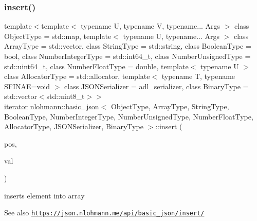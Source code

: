\subsubsection{\texorpdfstring{insert()}{insert()}\hspace{0.1cm}{\footnotesize\ttfamily [1/6]}}
{\footnotesize\ttfamily template$<$template$<$ typename U, typename V, typename... Args $>$ class Object\+Type = std\+::map, template$<$ typename U, typename... Args $>$ class Array\+Type = std\+::vector, class String\+Type  = std\+::string, class Boolean\+Type  = bool, class Number\+Integer\+Type  = std\+::int64\+\_\+t, class Number\+Unsigned\+Type  = std\+::uint64\+\_\+t, class Number\+Float\+Type  = double, template$<$ typename U $>$ class Allocator\+Type = std\+::allocator, template$<$ typename T, typename S\+F\+I\+N\+A\+E=void $>$ class J\+S\+O\+N\+Serializer = adl\+\_\+serializer, class Binary\+Type  = std\+::vector$<$std\+::uint8\+\_\+t$>$$>$ \\
\hyperlink{classnlohmann_1_1basic__json_aa549b2b382916b3baafb526e5cb410bd}{iterator} \hyperlink{classnlohmann_1_1basic__json}{nlohmann\+::basic\+\_\+json}$<$ Object\+Type, Array\+Type, String\+Type, Boolean\+Type, Number\+Integer\+Type, Number\+Unsigned\+Type, Number\+Float\+Type, Allocator\+Type, J\+S\+O\+N\+Serializer, Binary\+Type $>$\+::insert (\begin{DoxyParamCaption}\item[{\hyperlink{classnlohmann_1_1basic__json_aebd2cfa7e4ded4e97cde9269bfeeea38}{const\+\_\+iterator}}]{pos,  }\item[{const \hyperlink{classnlohmann_1_1basic__json}{basic\+\_\+json}$<$ Object\+Type, Array\+Type, String\+Type, Boolean\+Type, Number\+Integer\+Type, Number\+Unsigned\+Type, Number\+Float\+Type, Allocator\+Type, J\+S\+O\+N\+Serializer, Binary\+Type $>$ \&}]{val }\end{DoxyParamCaption})\hspace{0.3cm}{\ttfamily [inline]}}



inserts element into array 

\begin{DoxySeeAlso}{See also}
\href{https://json.nlohmann.me/api/basic_json/insert/}{\tt https\+://json.\+nlohmann.\+me/api/basic\+\_\+json/insert/} 
\end{DoxySeeAlso}
\mbox{\label{classnlohmann_1_1basic__json_a9c5b9de8a4a759861cb600b38a6c81b1}} 
